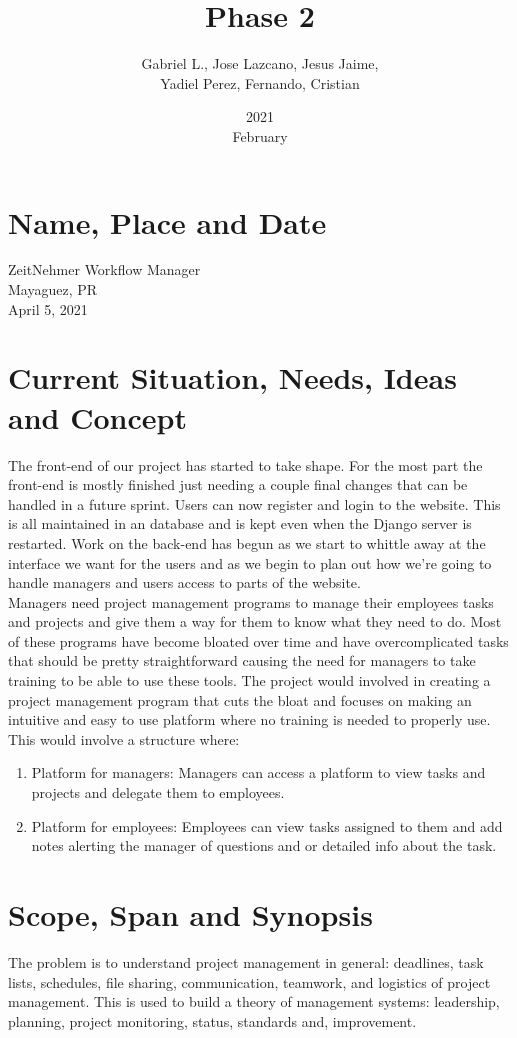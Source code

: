 \documentclass{article}[draft]
\title{Phase 2}
\date{2021\\February}
\author{Gabriel L., Jose Lazcano, Jesus Jaime,\\ Yadiel Perez, Fernando, Cristian}
\begin{document}
\maketitle
\section{Name, Place and Date}
ZeitNehmer Workflow Manager\\
Mayaguez, PR\\
April 5, 2021
\section{Current Situation, Needs, Ideas and Concept}
\vspace{10pt}
The front-end of our project has started to take shape. For the most part the front-end is mostly finished just needing a couple final changes that can be handled in a future sprint. Users can now register and login to the website. This is all maintained in an database and is kept even when the Django server is restarted. Work on the back-end has begun as we start to whittle away at the interface we want for the users and as we begin to plan out how we're going to handle managers and users access to parts of the website.
\\

Managers need project management programs to manage their employees tasks and projects and give them a way for them to know what they need to do. Most of these programs have become bloated over time and have overcomplicated tasks that should be pretty straightforward causing the need for managers to take training to be able to use these tools. The project would involved in creating a project management program that cuts the bloat and focuses on making an intuitive and easy to use platform where no training is needed to properly use. This would involve a structure where:
\begin{enumerate}
\item Platform for managers: Managers can access a platform to view tasks and projects and delegate them to employees.
\item Platform for employees: Employees can view tasks assigned to them and add notes alerting the manager of questions and or detailed info about the task.
\end{enumerate}
\section{Scope, Span and Synopsis}
\vspace{10pt}
The problem is to understand project management in general: deadlines, task lists, schedules, file sharing, communication, teamwork, and logistics of project management. This is used to build a theory of management systems: leadership, planning, project monitoring, status, standards and, improvement.
\end{document}
